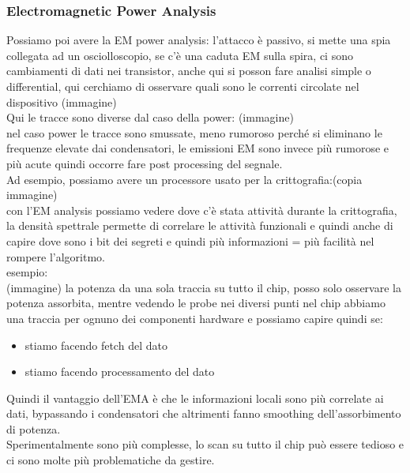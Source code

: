 \documentclass[oneside, 12pt]{extbook}
\begin{document}
\subsubsection{Electromagnetic Power Analysis}
Possiamo poi avere la EM power analysis: l'attacco è passivo, si mette una spia collegata ad un osciolloscopio, se c'è una caduta EM sulla spira, ci sono cambiamenti di dati nei transistor, anche qui si posson fare analisi simple o differential, qui cerchiamo di osservare quali sono le correnti circolate nel dispositivo (immagine)\\Qui le tracce sono diverse dal caso della power: (immagine)\\nel caso power le tracce sono smussate, meno rumoroso perché si eliminano le frequenze elevate dai condensatori, le emissioni EM sono invece più rumorose e più acute quindi occorre fare post processing del segnale.\\Ad esempio, possiamo avere un processore usato per la crittografia:(copia immagine)\\con l'EM analysis possiamo vedere dove c'è stata attività durante la crittografia, la densità spettrale permette di correlare le attività funzionali e quindi anche di capire dove sono i bit dei segreti e quindi più informazioni = più facilità nel rompere l'algoritmo.\\esempio:\\(immagine) la potenza da una sola traccia su tutto il chip, posso solo osservare la potenza assorbita, mentre vedendo le probe nei diversi punti nel chip abbiamo una traccia per ognuno dei componenti hardware e possiamo capire quindi se:
\begin{itemize}
	\item stiamo facendo fetch del dato
	\item stiamo facendo processamento del dato
\end{itemize}
Quindi il vantaggio dell'EMA è che le informazioni locali sono più correlate ai dati, bypassando i condensatori che altrimenti fanno smoothing dell'assorbimento di potenza.\\Sperimentalmente sono più complesse, lo scan su tutto il chip può essere tedioso e ci sono molte più problematiche da gestire.
\end{document}
